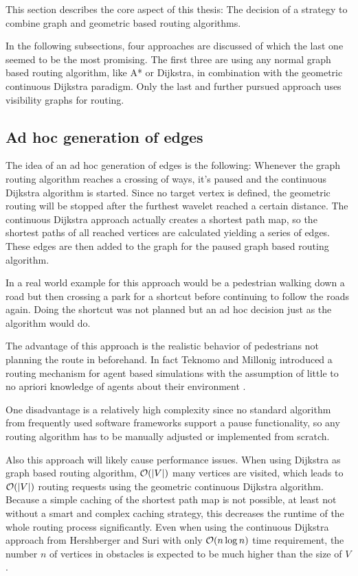 	This section describes the core aspect of this thesis:
	The decision of a strategy to combine graph and geometric based routing algorithms.
	
	In the following subsections, four approaches are discussed of which the last one seemed to be the most promising.
	The first three are using any normal graph based routing algorithm, like A* or Dijkstra, in combination with the geometric continuous Dijkstra paradigm.
	Only the last and further pursued approach uses visibility graphs for routing.
	
	\subsection{Ad hoc generation of edges}
	
		The idea of an ad hoc generation of edges is the following:
		Whenever the graph routing algorithm reaches a crossing of ways, it's paused and the continuous Dijkstra algorithm is started.
		Since no target vertex is defined, the geometric routing will be stopped after the furthest wavelet reached a certain distance.
		The continuous Dijkstra approach actually creates a shortest path map, so the shortest paths of all reached vertices are calculated yielding a series of edges.
		These edges are then added to the graph for the paused graph based routing algorithm.
		
		In a real world example for this approach would be a pedestrian walking down a road but then crossing a park for a shortcut before continuing to follow the roads again.
		Doing the shortcut was not planned but an ad hoc decision just as the algorithm would do.
		
		The advantage of this approach is the realistic behavior of pedestrians not planning the route in beforehand.
		In fact Teknomo and Millonig introduced a routing mechanism for agent based simulations with the assumption of little to no apriori knowledge of agents about their environment \cite{teknomo-millonig-routing}.
		
		One disadvantage is a relatively high complexity since no standard algorithm from frequently used software frameworks support a pause functionality, so any routing algorithm has to be manually adjusted or implemented from scratch.
		
		Also this approach will likely cause performance issues.
		When using Dijkstra as graph based routing algorithm, $\mathcal{O}(|V|)$ many vertices are visited, which leads to $\mathcal{O}(|V|)$ routing requests using the geometric continuous Dijkstra algorithm.
		Because a simple caching of the shortest path map is not possible, at least not without a smart and complex caching strategy, this decreases the runtime of the whole routing process significantly.
		Even when using the continuous Dijkstra approach from Hershberger and Suri \cite{hershberger-suri} with only $\mathcal{O}(n \log n)$ time requirement, the number $n$ of vertices in obstacles is expected to be much higher than the size of $V$.
		
